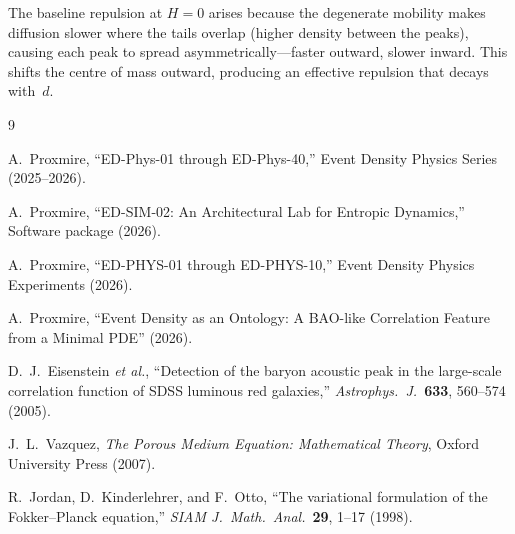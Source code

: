 \documentclass[11pt]{article}
\begin{document}
The baseline repulsion at \(H = 0\) arises because the degenerate mobility makes diffusion slower where the tails overlap (higher density between the peaks), causing each peak to spread asymmetrically---faster outward, slower inward. This shifts the centre of mass outward, producing an effective repulsion that decays with~\(d\).

\begin{thebibliography}{9}

A.~Proxmire, ``ED-Phys-01 through ED-Phys-40,'' Event Density Physics Series (2025--2026).

A.~Proxmire, ``ED-SIM-02: An Architectural Lab for Entropic Dynamics,'' Software package (2026).

A.~Proxmire, ``ED-PHYS-01 through ED-PHYS-10,'' Event Density Physics Experiments (2026).

A.~Proxmire, ``Event Density as an Ontology: A BAO-like Correlation Feature from a Minimal PDE'' (2026).

D.~J.~Eisenstein \emph{et al.}, ``Detection of the baryon acoustic peak in the large-scale correlation function of SDSS luminous red galaxies,'' \emph{Astrophys.\ J.}\ \textbf{633}, 560--574 (2005).

J.~L.~Vazquez, \emph{The Porous Medium Equation: Mathematical Theory}, Oxford University Press (2007).

R.~Jordan, D.~Kinderlehrer, and F.~Otto, ``The variational formulation of the Fokker--Planck equation,'' \emph{SIAM J.\ Math.\ Anal.}\ \textbf{29}, 1--17 (1998).

\end{thebibliography}
\end{document}
